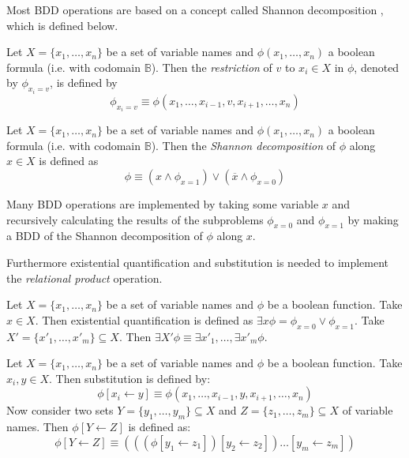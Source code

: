Most BDD operations are based on a concept called Shannon decomposition \cite{dijk2012parallelization}, which is defined below.

\begin{definition}[Restriction]
	Let $X = \{ x_1, \dots, x_n \}$ be a set of variable names and $\phi(x_1, \dots, x_n)$ a boolean formula (i.e. with codomain $\mathbb{B}$). Then the \emph{restriction} of $v$ to $x_i \in X$ in $\phi$, denoted by $\phi_{x_i=v}$, is defined by 
	\begin{equation}
		\phi_{x_i=v} \equiv \phi(x_1, \dots, x_{i - 1}, v, x_{i + 1}, \dots, x_n)
	\end{equation}
\end{definition}

\begin{definition}
	Let $X = \{ x_1, \dots, x_n \}$ be a set of variable names and $\phi(x_1, \dots, x_n)$ a boolean formula (i.e. with codomain $\mathbb{B}$). Then the \emph{Shannon decomposition} of $\phi$ along $x \in X$ is defined as
	\begin{equation}
		\phi \equiv (x \wedge \phi_{x=1}) \vee (\overline{x} \wedge \phi_{x=0})
	\end{equation}
\end{definition}

Many BDD operations are implemented by taking some variable $x$ and recursively calculating the results of the subproblems $\phi_{x=0}$ and $\phi_{x=1}$ by making a BDD of the Shannon decomposition of $\phi$ along $x$. 

Furthermore existential quantification and substitution is needed to implement the \emph{relational product} operation.

\begin{definition}
	Let $X = \{ x_1, \dots, x_n \}$ be a set of variable names and $\phi$ be a boolean function. Take $x \in X$. Then existential quantification is defined as $\exists x \phi = \phi_{x=0} \vee \phi_{x=1}$. Take $X' = \{ x'_1, \dots, x'_m \} \subseteq X$. Then $\exists X' \phi \equiv \exists x'_1, \dots, \exists x'_m \phi$.
\end{definition}

\begin{definition}[Substitution]
	Let $X = \{ x_1, \dots, x_n \}$ be a set of variable names and $\phi$ be a boolean function. Take $x_i, y \in X$. Then substitution is defined by:
	\begin{equation}
		\phi[x_i \gets y] \equiv \phi(x_1, \dots, x_{i - 1}, y, x_{i + 1}, \dots, x_n)
	\end{equation}
	Now consider two sets $Y = \{ y_1, \dots, y_m \} \subseteq X$ and $Z = \{ z_1, \dots, z_m \} \subseteq X$ of variable names. Then $\phi[Y \gets Z]$ is defined as:
	\begin{equation}
		\phi[Y \gets Z] \equiv (((\phi[y_1 \gets z_1])[y_2 \gets z_2]) \dots [y_m \gets z_m])
	\end{equation}
\end{definition}


